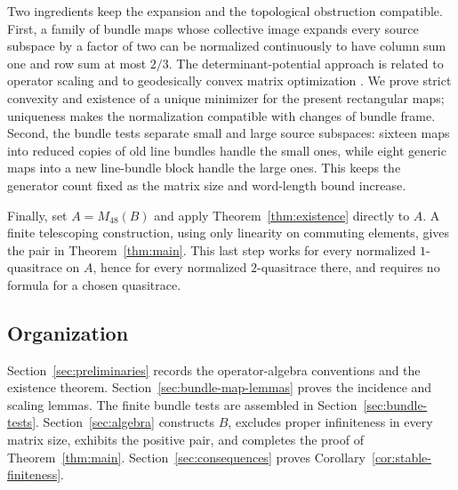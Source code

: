 Two ingredients keep the expansion and the topological obstruction
compatible. First, a family of bundle maps whose collective image
expands every source subspace by a factor of two can be normalized
continuously to have column sum one and row sum at most \(2/3\).
The determinant-potential approach is related to operator scaling
\cite[Section~4]{Gurvits2003} and to geodesically convex matrix
optimization \cite[Corollary~2.11]{SraHosseini2015}.
We prove strict convexity and existence of a unique minimizer for the
present rectangular maps; uniqueness makes the normalization compatible
with changes of bundle frame.
Second, the bundle tests separate small and large source subspaces:
sixteen maps into reduced copies of old line bundles handle the
small ones, while eight generic maps into a new line-bundle block
handle the large ones. This keeps the generator count fixed as the
matrix size and word-length bound increase.

Finally, set \(A=M_{48}(B)\) and apply Theorem~\ref{thm:existence}
directly to \(A\). A finite telescoping construction, using only
linearity on commuting elements, gives the pair in
Theorem~\ref{thm:main}. This last step works for every normalized
\(1\)-quasitrace on \(A\), hence for every normalized \(2\)-quasitrace
there, and requires no formula for a chosen quasitrace.

\subsection*{Organization}

Section~\ref{sec:preliminaries} records the operator-algebra
conventions and the existence theorem. Section~\ref{sec:bundle-map-lemmas}
proves the incidence and scaling lemmas. The finite bundle tests
are assembled in Section~\ref{sec:bundle-tests}. Section~\ref{sec:algebra}
constructs \(B\), excludes proper infiniteness in every matrix size,
exhibits the positive pair, and completes the proof of
Theorem~\ref{thm:main}. Section~\ref{sec:consequences} proves
Corollary~\ref{cor:stable-finiteness}.
